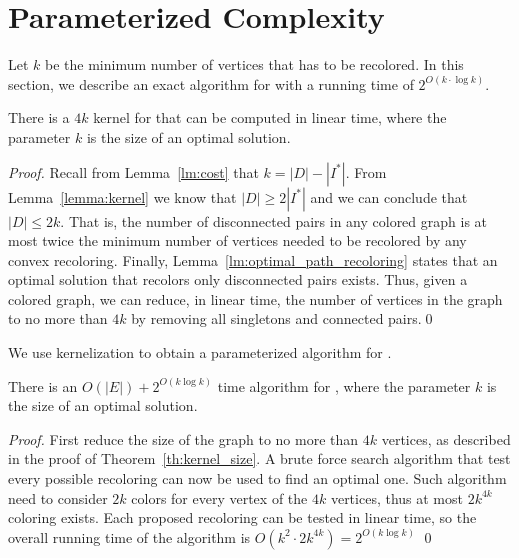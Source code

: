 \section{Parameterized Complexity}
\label{sec:fpt}

Let $k$ be the minimum number of vertices that has to be recolored. In this
section, we describe an exact algorithm for \TWOCR{} with a running time
of $2^{O(k\cdot \log{k})}$.

\begin{theorem}
\label{th:kernel_size}
There is a $4k$ kernel for \TWOCR{} that can be computed in linear time, where the
parameter $k$ is the size of an optimal solution.
\end{theorem}

\begin{proof}
Recall from Lemma~\ref{lm:cost} that $k = |D| - |I^*|$.
From Lemma~\ref{lemma:kernel} we know that $|D| \geq 2|I^*|$ and we can
conclude that $|D| \leq 2k$.
That is, the number of disconnected pairs in any colored graph is at most twice
the minimum number of vertices needed to be recolored by any convex recoloring.
Finally, Lemma~\ref{lm:optimal_path_recoloring} states that an optimal solution
that recolors only disconnected pairs exists.
Thus, given a colored graph, we can reduce, in linear time, the number of
vertices in the graph to no more than $4k$ by removing all singletons and connected
pairs.\qed{}
\end{proof}

We use kernelization to obtain a parameterized algorithm for \TWOCR{}.

\begin{theorem}
There is an $O(|E|) + 2^{O(k\log{k})}$ time algorithm for \TWOCR{}, where
the parameter $k$ is the size of an optimal solution.
\end{theorem}

\begin{proof}
	First reduce the size of the graph to no more than $4k$ vertices, as described
	in the proof of Theorem~\ref{th:kernel_size}.
	A brute force search algorithm
	that test every possible recoloring can now be used to find an optimal one.
	Such algorithm need to consider $2k$ colors for every vertex of the $4k$
	vertices, thus at most $2k^{4k}$ coloring exists. 
	Each proposed recoloring can be tested in linear time, so the overall running
	time of the algorithm is $O(k^2 \cdot 2k^{4k}) =  2^{O(k\log{k})}$
\qed{}\end{proof}

